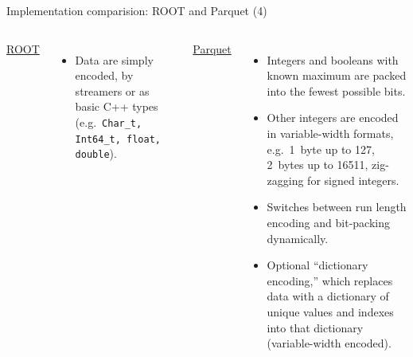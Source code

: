 \documentclass[aspectratio=169]{beamer}
\begin{document}
\begin{frame}{Implementation comparision: ROOT and Parquet (4)}
\vspace{0.5 cm}
\begin{columns}
{\large \underline{ROOT}}

\begin{itemize}
\item Data are simply encoded, by streamers or as basic C++ types (e.g.\ {\tt\small Char\_t, Int64\_t, float, double}).
\end{itemize}

{\large \underline{Parquet}}

\begin{itemize}
\item Integers and booleans with known maximum are packed into the fewest possible bits.

\item Other integers are encoded in variable-width formats, e.g.\ 1~byte up to 127, 2~bytes up to 16511, zig-zagging for signed integers.

\item Switches between run length encoding and bit-packing dynamically.

\item Optional ``dictionary encoding,'' which replaces data with a dictionary of unique values and indexes into that dictionary (variable-width encoded).
\end{itemize}
\end{columns}
\end{frame}
\end{document}
